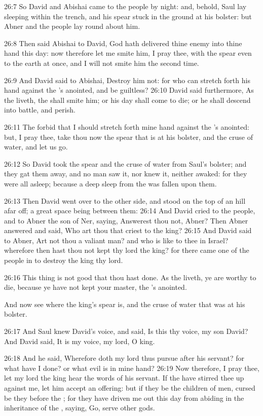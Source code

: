 26:7 So David and Abishai came to the people by night: and, behold,
Saul lay sleeping within the trench, and his spear stuck in the ground
at his bolster: but Abner and the people lay round about him.

26:8 Then said Abishai to David, God hath delivered thine enemy into
thine hand this day: now therefore let me smite him, I pray thee, with
the spear even to the earth at once, and I will not smite him the
second time.

26:9 And David said to Abishai, Destroy him not: for who can stretch
forth his hand against the \LORD's anointed, and be guiltless?  26:10
David said furthermore, As the \LORD liveth, the \LORD shall smite him;
or his day shall come to die; or he shall descend into battle, and
perish.

26:11 The \LORD forbid that I should stretch forth mine hand against
the \LORD's anointed: but, I pray thee, take thou now the spear that is
at his bolster, and the cruse of water, and let us go.

26:12 So David took the spear and the cruse of water from Saul's
bolster; and they gat them away, and no man saw it, nor knew it,
neither awaked: for they were all asleep; because a deep sleep from
the \LORD was fallen upon them.

26:13 Then David went over to the other side, and stood on the top of
an hill afar off; a great space being between them: 26:14 And David
cried to the people, and to Abner the son of Ner, saying, Answerest
thou not, Abner? Then Abner answered and said, Who art thou that
criest to the king?  26:15 And David said to Abner, Art not thou a
valiant man? and who is like to thee in Israel? wherefore then hast
thou not kept thy lord the king? for there came one of the people in
to destroy the king thy lord.

26:16 This thing is not good that thou hast done. As the \LORD liveth,
ye are worthy to die, because ye have not kept your master, the \LORD's
anointed.

And now see where the king's spear is, and the cruse of water that was
at his bolster.

26:17 And Saul knew David's voice, and said, Is this thy voice, my son
David? And David said, It is my voice, my lord, O king.

26:18 And he said, Wherefore doth my lord thus pursue after his
servant?  for what have I done? or what evil is in mine hand?  26:19
Now therefore, I pray thee, let my lord the king hear the words of his
servant. If the \LORD have stirred thee up against me, let him accept
an offering: but if they be the children of men, cursed be they before
the \LORD; for they have driven me out this day from abiding in the
inheritance of the \LORD, saying, Go, serve other gods.

